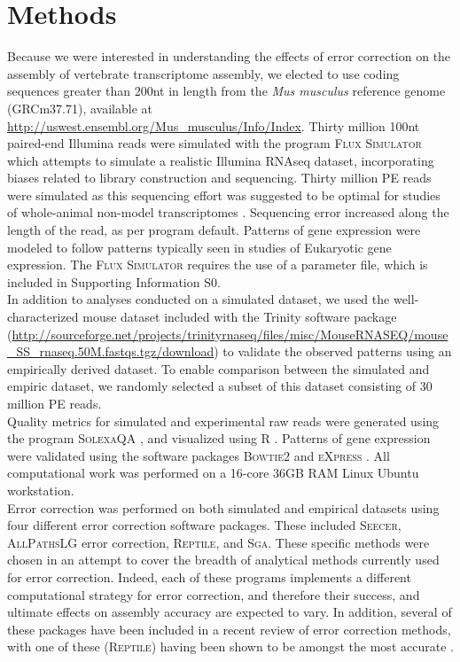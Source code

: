 \documentclass[11pt]{article}
\begin{document}
\section*{Methods}
Because we were interested in understanding the effects of error correction on the assembly of vertebrate transcriptome assembly, we elected to use coding sequences greater than 200nt in length from the \textit{Mus musculus} reference genome (GRCm37.71), available at \url{http://uswest.ensembl.org/Mus_musculus/Info/Index}.  Thirty million 100nt paired-end Illumina reads were simulated with the program \textsc{Flux Simulator} \citep{Griebel:2012ti} which attempts to simulate a realistic Illumina RNAseq dataset, incorporating biases related to library construction and sequencing. Thirty million PE reads were simulated as this sequencing effort was suggested to be optimal for studies of whole-animal non-model transcriptomes \citep{Francis:2013gc}. Sequencing error increased along the length of the read, as per program default. Patterns of gene expression were modeled to follow patterns typically seen in studies of Eukaryotic gene expression. The \textsc{Flux Simulator} requires the use of a parameter file, which is included in Supporting Information S0.  \\

\noindent
In addition to analyses conducted on a simulated dataset, we used the well-characterized mouse dataset included with the Trinity software package (\url{http://sourceforge.net/projects/trinityrnaseq/files/misc/MouseRNASEQ/mouse_SS_rnaseq.50M.fastqs.tgz/download}) to validate the observed patterns using an empirically derived dataset.  To enable comparison between the simulated and empiric dataset, we randomly selected a subset of this dataset consisting of 30 million PE reads. \\

\noindent
Quality metrics for simulated and experimental raw reads were generated using the program \textsc{SolexaQA} \citep{Cox:2010ch}, and visualized using R \citep{RALanguageandEn:wf}. Patterns of gene expression were validated using the software packages \textsc{Bowtie2} \citep{Trapnell:2010kd} and \textsc{eXpress} \citep{Roberts:2012dh}. All computational work was performed on a 16-core 36GB RAM Linux Ubuntu workstation. \\

\noindent
Error correction was performed on both simulated and empirical datasets using four different error correction software packages. These included \textsc{Seecer}, \textsc{AllPathsLG} error correction, \textsc{Reptile}, and \textsc{Sga}. These specific methods were chosen in an attempt to cover the breadth of analytical methods currently used for error correction. Indeed, each of these programs implements a different computational strategy for error correction, and therefore their success, and ultimate effects on assembly accuracy are expected to vary.  In addition, several of these packages have been included in a recent review of error correction methods, with one of these (\textsc{Reptile}) having been shown to be amongst the most accurate \citep{Yang:2013ck}.  \\
\end{document}
